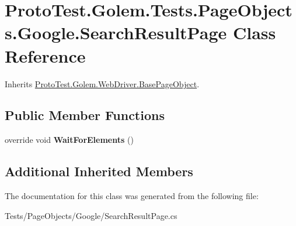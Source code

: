 \hypertarget{class_proto_test_1_1_golem_1_1_tests_1_1_page_objects_1_1_google_1_1_search_result_page}{\section{Proto\-Test.\-Golem.\-Tests.\-Page\-Objects.\-Google.\-Search\-Result\-Page Class Reference}
\label{class_proto_test_1_1_golem_1_1_tests_1_1_page_objects_1_1_google_1_1_search_result_page}
}


Inherits \hyperlink{class_proto_test_1_1_golem_1_1_web_driver_1_1_base_page_object}{Proto\-Test.\-Golem.\-Web\-Driver.\-Base\-Page\-Object}.

\subsection*{Public Member Functions}
\begin{DoxyCompactItemize}
\item 
\hypertarget{class_proto_test_1_1_golem_1_1_tests_1_1_page_objects_1_1_google_1_1_search_result_page_a15f20e1ccd76cec6da31c386fa29d4ad}{override void {\bfseries Wait\-For\-Elements} ()}\label{class_proto_test_1_1_golem_1_1_tests_1_1_page_objects_1_1_google_1_1_search_result_page_a15f20e1ccd76cec6da31c386fa29d4ad}

\end{DoxyCompactItemize}
\subsection*{Additional Inherited Members}


The documentation for this class was generated from the following file\-:\begin{DoxyCompactItemize}
\item 
Tests/\-Page\-Objects/\-Google/Search\-Result\-Page.\-cs\end{DoxyCompactItemize}
